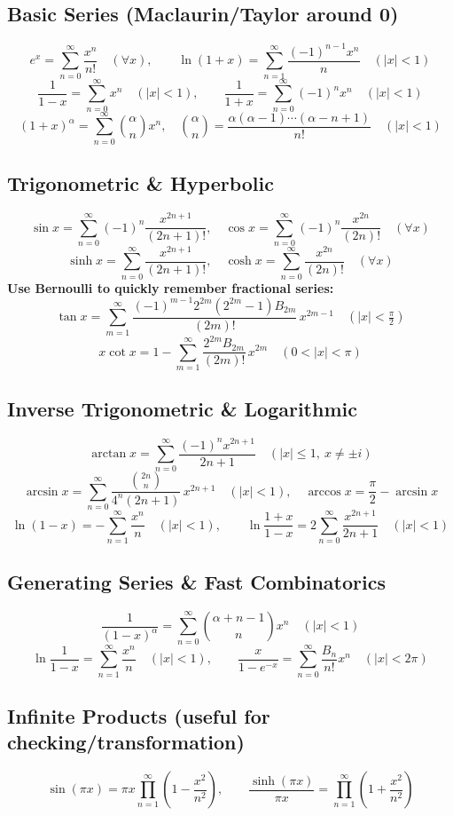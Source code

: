 \subsection*{Basic Series (Maclaurin/Taylor around 0)}
\[
e^x=\sum_{n=0}^{\infty}\frac{x^n}{n!}\quad(\forall x),\qquad
\ln(1+x)=\sum_{n=1}^{\infty}\frac{(-1)^{n-1}x^n}{n}\quad(|x|<1)
\]
\[
\frac{1}{1-x}=\sum_{n=0}^{\infty}x^n\quad(|x|<1),\qquad
\frac{1}{1+x}=\sum_{n=0}^{\infty}(-1)^n x^n\quad(|x|<1)
\]
\[
(1+x)^{\alpha}=\sum_{n=0}^{\infty}\binom{\alpha}{n}x^n,\quad
\binom{\alpha}{n}=\frac{\alpha(\alpha-1)\cdots(\alpha-n+1)}{n!}\quad(|x|<1)
\]

\subsection*{Trigonometric \& Hyperbolic}
\[
\sin x=\sum_{n=0}^{\infty}(-1)^n\frac{x^{2n+1}}{(2n+1)!},\quad
\cos x=\sum_{n=0}^{\infty}(-1)^n\frac{x^{2n}}{(2n)!}\quad(\forall x)
\]
\[
\sinh x=\sum_{n=0}^{\infty}\frac{x^{2n+1}}{(2n+1)!},\quad
\cosh x=\sum_{n=0}^{\infty}\frac{x^{2n}}{(2n)!}\quad(\forall x)
\]
\textbf{Use Bernoulli to quickly remember fractional series:}
\[
\tan x=\sum_{m=1}^{\infty}\frac{(-1)^{m-1}2^{2m}(2^{2m}-1)B_{2m}}{(2m)!}\,x^{2m-1}\quad(|x|<\tfrac{\pi}{2})
\]
\[
x\cot x=1-\sum_{m=1}^{\infty}\frac{2^{2m}B_{2m}}{(2m)!}\,x^{2m}\quad(0<|x|<\pi)
\]

\subsection*{Inverse Trigonometric \& Logarithmic}
\[
\arctan x=\sum_{n=0}^{\infty}\frac{(-1)^n x^{2n+1}}{2n+1}\quad(|x|\le1,\ x\neq\pm i)
\]
\[
\arcsin x=\sum_{n=0}^{\infty}\frac{\binom{2n}{n}}{4^n(2n+1)}\,x^{2n+1}\quad(|x|<1),\quad
\arccos x=\frac{\pi}{2}-\arcsin x
\]
\[
\ln(1-x)=-\sum_{n=1}^{\infty}\frac{x^n}{n}\quad(|x|<1),\qquad
\ln\frac{1+x}{1-x}=2\sum_{n=0}^{\infty}\frac{x^{2n+1}}{2n+1}\quad(|x|<1)
\]

\subsection*{Generating Series \& Fast Combinatorics}
\[
\frac{1}{(1-x)^{\alpha}}=\sum_{n=0}^{\infty}\binom{\alpha+n-1}{n}x^n\quad(|x|<1)
\]
\[
\ln\frac{1}{1-x}=\sum_{n=1}^{\infty}\frac{x^n}{n}\quad(|x|<1),\qquad
\frac{x}{1-e^{-x}}=\sum_{n=0}^{\infty}\frac{B_n}{n!}x^n\quad(|x|<2\pi)
\]

\subsection*{Infinite Products (useful for checking/transformation)}
\[
\sin(\pi x)=\pi x\prod_{n=1}^{\infty}\left(1-\frac{x^2}{n^2}\right),\qquad
\frac{\sinh(\pi x)}{\pi x}=\prod_{n=1}^{\infty}\left(1+\frac{x^2}{n^2}\right)
\]